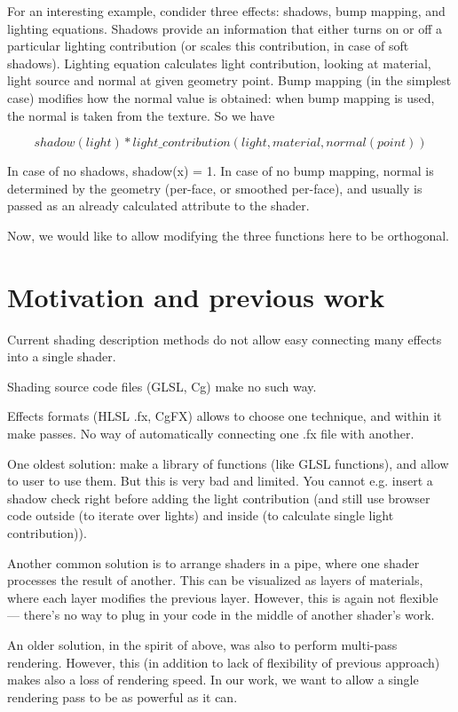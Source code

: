 \documentclass{acmsiggraph}                     %
\begin{document}
For an interesting example, condider three effects: shadows, bump
mapping, and lighting equations. Shadows provide an information that
either turns on or off a particular lighting contribution (or scales
this contribution, in case of soft shadows). Lighting equation
calculates light contribution, looking at material, light source and
normal at given geometry point. Bump mapping (in the simplest case)
modifies how the normal value is obtained: when bump mapping is used,
the normal is taken from the texture. So we have

$$  shadow(light) * light\_contribution(light, material, normal(point)) $$

In case of no shadows, shadow(x) = 1. In case of no bump mapping,
normal is determined by the geometry (per-face, or smoothed per-face),
and usually is passed as an already calculated attribute to the
shader.

Now, we would like to allow modifying the three functions here to be
orthogonal.

\section{Motivation and previous work}

Current shading description methods do not allow easy connecting
many effects into a single shader.

Shading source code files (GLSL, Cg) make no such way.

Effects formats (HLSL .fx, CgFX) allows to choose one technique, and
within it make passes. No way of automatically connecting one .fx file
with another.

One oldest solution: make a library of functions (like GLSL
functions), and allow to user to use them. But this is very bad and
limited. You cannot e.g. insert a shadow check right before adding the
light contribution (and still use browser code outside (to iterate
over lights) and inside (to calculate single light contribution)).

Another common solution is to arrange shaders in a pipe, where one
shader processes the result of another. This can be visualized as
layers of materials, where each layer modifies the previous
layer. However, this is again not flexible --- there's no way to plug
in your code in the middle of another shader's work.

An older solution, in the spirit of above, was also to perform
multi-pass rendering. However, this (in addition to lack of
flexibility of previous approach) makes also a loss of rendering
speed. In our work, we want to allow a single rendering pass to be as
powerful as it can.
\end{document}

